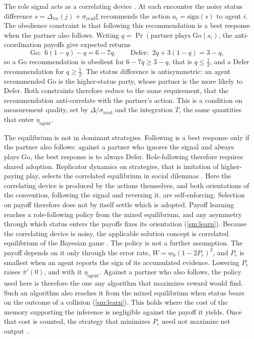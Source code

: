 \documentclass[
  aps,prx,
  preprint,
  superscriptaddress,
  nofootinbib
]{revtex4-2}
\newcommand{\etaag}{\eta_{\mathrm{agent}}}
\newcommand{\sread}{\sigma_{\mathrm{read}}}
\newcommand{\sign}{\mathrm{sign}}
\newcommand{\pibar}{\bar\pi}
\begin{document}
\noindent The role signal acts as a correlating device \cite{aumann1974,aumann1987}. At each encounter the noisy status difference $s=\Delta_{im}(j)+\sread\xi$ recommends the action $a_i=\sign(s)$ to agent $i$. The obedience constraint is that following this recommendation is a best response when the partner also follows. Writing $q=\Pr(\text{partner plays Go}\mid s_i)$, the anti-coordination payoffs give expected returns
\begin{equation}
\text{Go:}\;\; 6(1-q)-q=6-7q,\qquad \text{Defer:}\;\; 2q+3(1-q)=3-q,
\end{equation}
so a Go recommendation is obedient for $6-7q\ge3-q$, that is $q\le\tfrac12$, and a Defer recommendation for $q\ge\tfrac12$. The status difference is antisymmetric: an agent recommended Go is the higher-status party, whose partner is the more likely to Defer. Both constraints therefore reduce to the same requirement, that the recommendation anti-correlate with the partner's action. This is a condition on measurement quality, set by $\Delta/\sread$ and the integration $T$, the same quantities that enter $\etaag$.

The equilibrium is not in dominant strategies. Following is a best response only if the partner also follows: against a partner who ignores the signal and always plays Go, the best response is to always Defer. Role-following therefore requires shared adoption. Replicator dynamics on strategies, that is imitation of higher-paying play, selects the correlated equilibrium in social dilemmas \cite{touzel2026fitnesslandscapesocialnorms}. Here the correlating device is produced by the actions themselves, and both orientations of the convention, following the signal and reversing it, are self-enforcing. Selection on payoff therefore does not by itself settle which is adopted. Payoff learning reaches a role-following policy from the mixed equilibrium, and any asymmetry through which status enters the payoffs fixes its orientation (\cref{sm:learn}). Because the correlating device is noisy, the applicable solution concept is correlated equilibrium of the Bayesian game \cite{bergemann2016}. The policy is not a further assumption. The payoff depends on it only through the error rate, $W=w_0(1-2P_e)^2$, and $P_e$ is smallest when an agent reports the sign of its accumulated evidence. Lowering $P_e$ raises $\pibar'(0)$, and with it $\etaag$. Against a partner who also follows, the policy used here is therefore the one any algorithm that maximizes reward would find. Such an algorithm also reaches it from the mixed equilibrium when status bears on the outcome of a collision (\cref{sm:learn}). This holds where the cost of the memory supporting the inference is negligible against the payoff it yields. Once that cost is counted, the strategy that minimizes $P_e$ need not maximize net output \cite{STILL}.
\end{document}
